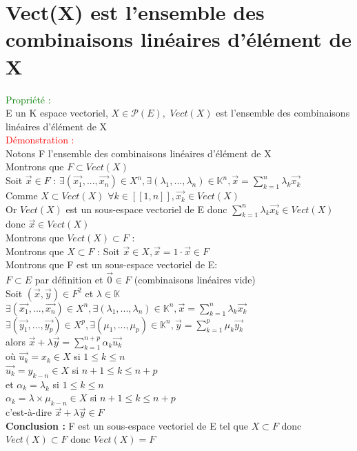 \documentclass{article}
\begin{document}
 \section{Vect(X) est l'ensemble des combinaisons linéaires d'élément de X}
 \textcolor{green}{Propriété :} \\ 
 E un K espace vectoriel, $X \in  \mathcal{P}(E),$ $Vect(X)$ est l'ensemble des combinaisons linéaires d'élément de X \\ 
 \textcolor{red}{Démonstration :} \\ 
 Notons F l'ensemble des combinaisons linéaires d'élément de X \\ 
 Montrons que $F \subset Vect(X)$ \\ 
 Soit $\vec{x} \in F$ : $\exists(\vec{x_1},...,\vec{x_n}) \in X^n, \exists (\lambda_1,...,\lambda_n) \in \mathbb{K}^n, \vec{x}=\sum_{k=1}^n \lambda_k \vec{x_k}$ \\ 
 Comme $X \subset Vect(X)$ $\forall k \in [[1,n]], \vec{x_k} \in  Vect(X)$ \\ 
 Or $Vect(X)$ est un sous-espace vectoriel de E donc $\sum_{k=1}^n \lambda_k \vec{x_k} \in Vect(X)$ donc $\vec{x} \in Vect(X)$ \\ 
 Montrons que $Vect(X) \subset F$ :\\ 
 Montrons que $X \subset F$ : Soit $\vec{x} \in X, \vec{x}= 1 \cdot \vec{x} \in F$ \\ 
 Montrons que F est un sous-espace vectoriel de E: \\ 
 $F \subset E$ par définition et $\vec{0} \in F$ (combinaisons linéaires vide) \\ 
 Soit $(\vec{x}, \vec{y}) \in F^2$ et $\lambda \in \mathbb{K}$ \\ 
 $\exists (\vec{x_1},...,\vec{x_n}) \in X^n, \exists (\lambda_1,...,\lambda_n) \in \mathbb{K}^n,\vec{x}= \sum_{k=1}^n \lambda_k \vec{x_k}$ \\ 
 $\exists (\vec{y_1},...,\vec{y_p}) \in X^p, \exists (\mu_1,...,\mu_p) \in \mathbb{K}^n,\vec{y}= \sum_{k=1}^p \mu_k \vec{y_k}$ \\ 
 alors $\vec{x}+ \lambda \vec{y}= \sum_{k=1}^{n+p}\alpha_k \vec{u_k}$ \\ 
 où $\vec{u_k} = x_k \in X$ si $1 \leq k \leq n$ \\  
 $\vec{u_k} =y_{k-n} \in X$ si $n+1 \leq k \leq n+p$ \\ 
 et $\alpha_k= \lambda_k$ si $1 \leq k \leq n$ \\ 
 $\alpha_k=\lambda \times  \mu_{k-n} \in X$ si $n+1 \leq k \leq n+p$ \\ 
 c'est-à-dire $\vec{x}+ \lambda \vec{y} \in F$ \\ 
 {\bf Conclusion :} F est un sous-espace vectoriel de E tel que $X \subset F$ donc $Vect(X) \subset F$ donc $Vect(X) = F$
\end{document}
